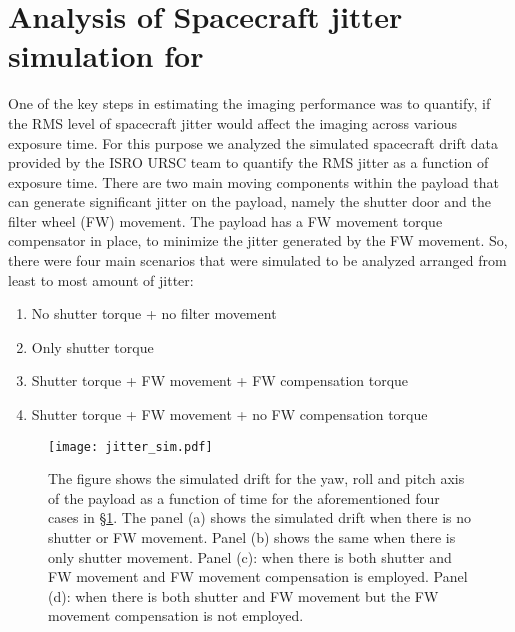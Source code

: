 \section{Analysis of Spacecraft jitter simulation for {\suit}}\label{sec:suit_jitter}

One of the key steps in estimating the imaging performance was to quantify, if the RMS level of spacecraft jitter would affect the imaging across various exposure time. For this purpose we analyzed the simulated spacecraft drift data provided by the ISRO URSC team to quantify the RMS jitter as a function of exposure time. There are two main moving components within the payload that can generate significant jitter on the payload, namely the shutter door and the filter wheel (FW) movement. The payload has a FW movement torque compensator in place, to minimize the jitter generated by the FW movement. So, there were four main scenarios that were simulated to be analyzed arranged from least to most amount of jitter:

\begin{enumerate}
    \item No shutter torque + no filter movement
    \item Only shutter torque
    \item Shutter torque + FW movement + FW compensation torque
    \item Shutter torque + FW movement + no FW compensation torque
\end{enumerate}

\begin{figure}[ht!]
    \centering
    \texttt{[image: jitter\_sim.pdf]}
    \caption{The figure shows the simulated drift for the yaw, roll and pitch axis of the payload as a function of time for the aforementioned four cases in \S\ref{sec:suit_jitter}. The panel (a) shows the simulated drift when there is no shutter or FW movement. Panel (b) shows the same when there is only shutter movement. Panel (c): when there is both shutter and FW movement and FW movement compensation is employed. Panel (d): when there is both shutter and FW movement but the FW movement compensation is not employed.}
    \label{fig:jitter_sim}
\end{figure}

